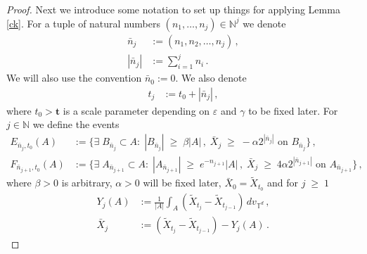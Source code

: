 \documentclass[11pt]{article}
\numberwithin{equation}{section}
\theoremstyle{definition}
\renewcommand{\tilde}{\widetilde}          %
\renewcommand{\leq}{\;\leqslant\;}                   %
\renewcommand{\geq}{\;\geqslant\;}                   %
\newcommand{\N}{\mathbb{N}}
\def\eps{\varepsilon}
\def\T{\mathbb{T}}
\newcommand{\ab}{|}
\begin{document}
\begin{proof}
Next we introduce some notation to set up things for applying Lemma \ref{ck}. For a tuple of natural numbers $(n_1,\hdots, n_j) \in \N^j$ we denote
\begin{align*}
\bar n_j &:= (n_1,n_2,\hdots,n_j)\,, \\
\ab \bar n_j \ab &:= \sum_{i=1}^j n_i\,.
\end{align*}
We will also use the convention $\bar n_0 := 0$. We also denote
\begin{align*}
t_j &:= t_0 + \ab \bar n_j \ab \,,
\end{align*}
where $t_0 > \mathbf{t}$ is a scale parameter depending on $\eps$ and $\gamma$ to be fixed later. For $j \in \N$ we define the events
\begin{align*}
E_{\bar n_{j},t_0}(A) &:=  \{ \exists \; B_{\bar n_{j}} \subset A: \; |B_{\bar n_{j}}| \geq \beta \ab A \ab \,, \; \bar X_{j} \geq - \alpha 2^{\ab \bar n_{j} \ab} \text{ on } B_{\bar n_{j}}  \}\,, \\
F_{\bar n_{j+1},t_0}(A) &:= \{ \exists  \;  A_{\bar n_{j+1}} \subset A: \; |A_{\bar n_{j+1}}| \geq e^{-n_{j+1}} \ab A \ab \,, \; \bar X_{j} \geq 4 \alpha 2^{|\bar n_{j+1}|} \text{ on } A_{\bar n_{j+1}}\}\,,
\end{align*}
where $\beta > 0$ is arbitrary, $\alpha > 0$ will be fixed later, $\bar X_0 = \tilde X_{t_0}$ and for $j \geq 1$
\begin{align*}
Y_j(A) &:= \tfrac{1}{|A|} \int_{A} (  \tilde X_{t_j} - \tilde X_{t_{j-1}}) \, dv_{\T^d}\,, \\
\bar X_j &:= (\tilde X_{t_j}-\tilde X_{t_{j-1}}) - Y_j(A)\,.
\end{align*}


\end{proof}
\end{document}
